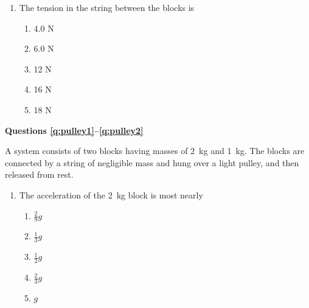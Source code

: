 \documentclass{../../../oss-apphys}
\begin{document}
\begin{multicols}{2}
\begin{enumerate}[resume,leftmargin=18pt]
  \item The tension in the string between the blocks is
    \begin{enumerate}[nosep,leftmargin=18pt,label=(\Alph*)]
    \item 4.0 N
    \item 6.0 N
    \item 12 N
    \item 16 N
    \item 18 N
    \end{enumerate}
    \label{q:2blocks2}
  \end{enumerate}
  \columnbreak
  
  \textbf{Questions \ref{q:pulley1}--\ref{q:pulley2}}

  A system consists of two blocks having masses of \SI{2}{\kilo\gram} and
  \SI{1}{\kilo\gram}. The blocks are connected by a string of negligible mass
  and hung over a light pulley, and then released from rest.
  \begin{center}
  \end{center}
  
  \begin{enumerate}[resume,leftmargin=18pt]
  \item The acceleration of the \SI{2}{\kilo\gram} block is most nearly
    \begin{enumerate}[nosep,leftmargin=18pt,label=(\Alph*)]
    \item $\displaystyle\frac29g$
    \item $\displaystyle\frac13g$
    \item $\displaystyle\frac12g$
    \item $\displaystyle\frac23g$
    \item $g$
    \end{enumerate}
    \label{q:pulley1}
    

\end{enumerate}
\end{multicols}
\end{document}
